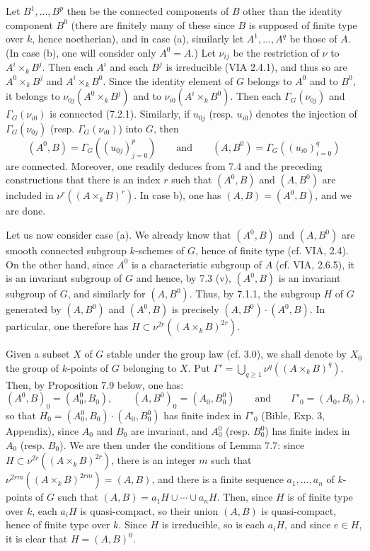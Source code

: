 Let $B^1,\ldots,B^p$ then be the connected components of $B$ other than the identity component $B^0$ (there are finitely many of these since $B$ is supposed of finite type over $k$, hence noetherian), and in case (a), similarly let $A^1,\ldots,A^q$ be those of $A$. (In case (b), one will consider only $A^0=A$.) Let $\nu_{ij}$ be the restriction of $\nu$ to $A^i\times_k B^j$. Then each $A^i$ and each $B^j$ is irreducible (VIA 2.4.1), and thus so are $A^0\times_k B^j$ and $A^i\times_k B^0$. Since the identity element of $G$ belongs to $A^0$ and to $B^0$, it belongs to $\nu_{0j}(A^0\times_k B^j)$ and to $\nu_{i0}(A^i\times_k B^0)$. Then each $\Gamma_G(\nu_{0j})$ and $\Gamma_G(\nu_{i0})$ is connected (7.2.1). Similarly, if $u_{0j}$ (resp. $u_{i0}$) denotes the injection of $\Gamma_G(\nu_{0j})$ (resp. $\Gamma_G(\nu_{i0})$) into $G$, then
\[
(A^0,B)=\Gamma_G((u_{0j})_{j=0}^p)\qquad\text{and}\qquad(A,B^0)=\Gamma_G((u_{i0})_{i=0}^q)
\]
are connected. Moreover, one readily deduces from 7.4 and the preceding constructions that there is an index $r$ such that $(A^0,B)$ and $(A,B^0)$ are included in $\nu^r((A\times_k B)^r)$. In case b), one has $(A,B)=(A^0,B)$, and we are done.

Let us now consider case (a). We already know that $(A^0,B)$ and $(A,B^0)$ are smooth connected subgroup $k$-schemes of $G$, hence of finite type (cf. VIA, 2.4). On the other hand, since $A^0$ is a characteristic subgroup of $A$ (cf. VIA, 2.6.5), it is an invariant subgroup of $G$ and hence, by 7.3 (v), $(A^0,B)$ is an invariant subgroup of $G$, and similarly for $(A,B^0)$. Thus, by 7.1.1, the subgroup $H$ of $G$ generated by $(A,B^0)$ and $(A^0,B)$ is precisely $(A,B^0)\cdot(A^0,B)$. In particular, one therefore has $H\subset\nu^{2r}((A\times_k B)^{2r})$.

Given a subset $X$ of $G$ stable under the group law (cf. 3.0), we shall denote by $X_0$ the group of $k$-points of $G$ belonging to $X$. Put $\Gamma'=\bigcup_{q\geq1}\nu^q((A\times_k B)^q)$. Then, by Proposition 7.9 below, one has:
\[
(A^0,B)_0=(A_0^0,B_0),\qquad(A,B^0)_0=(A_0,B_0^0)\qquad\text{and}\qquad\Gamma'_0=(A_0,B_0),
\]
so that $H_0=(A_0^0,B_0)\cdot(A_0,B_0^0)$ has finite index in $\Gamma'_0$ (Bible, Exp. 3, Appendix), since $A_0$ and $B_0$ are invariant, and $A_0^0$ (resp. $B_0^0$) has finite index in $A_0$ (resp. $B_0$). We are then under the conditions of Lemma 7.7: since $H\subset\nu^{2r}((A\times_k B)^{2r})$, there is an integer $m$ such that $\nu^{2rm}((A\times_k B)^{2rm})=(A,B)$, and there is a finite sequence $a_1,\ldots,a_n$ of $k$-points of $G$ such that $(A,B)=a_1H\cup\cdots\cup a_nH$. Then, since $H$ is of finite type over $k$, each $a_iH$ is quasi-compact, so their union $(A,B)$ is quasi-compact, hence of finite type over $k$. Since $H$ is irreducible, so is each $a_iH$, and since $e\in H$, it is clear that $H=(A,B)^0$.

